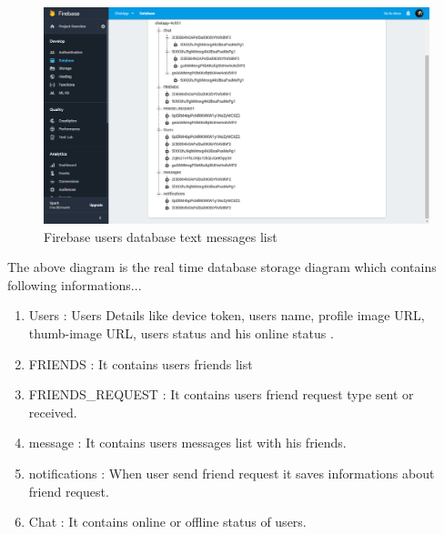 \begin{figure}[!ht]
	\centering
	\includegraphics[scale=0.3]{databaseone.png}
	\caption{\label{img8}  Firebase users database text messages list}
\end{figure}
\vspace{10ex}
The above diagram is the real time database storage diagram which contains following informations...\\
\begin{enumerate}
	\setlength{\itemsep}{-0.3em}
	\item Users : Users Details like device token, users name, profile image URL, thumb-image URL, users status and his online status .\\
	\item FRIENDS : It contains users friends list\\
	\item {FRIENDS\_REQUEST : It contains users friend request type sent or received.\\}
	\item message : It contains users messages list with his friends.\\
	\item  notifications : When user send friend request it saves informations about friend request.\\
	\item Chat : It contains online or offline status of users. 
	
\end{enumerate}

